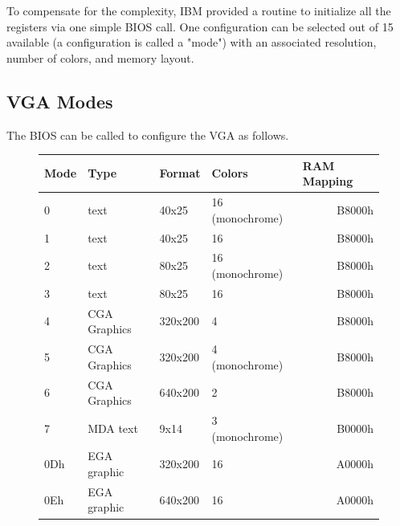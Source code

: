 \documentclass[book.tex]{subfiles}
\begin{document}
\bigskip



To compensate for the complexity, IBM provided a routine to initialize all the registers via one simple BIOS call. One configuration can be selected out of 15 available (a configuration is called a "mode") with an associated resolution, number of colors, and memory layout.

\subsection{VGA Modes}

The BIOS can be called to configure the VGA as follows.

\begin{figure}[H]
\centering
\begin{table}[H]
\begin{tabularx}{\textwidth}[c]{llllr}
\hline
\textbf{Mode} & \textbf{Type} & \textbf{Format} & \textbf{Colors} & \multicolumn{1}{l}{\textbf{RAM Mapping}} \\ \hline
0             & text          & 40x25           & 16 (monochrome) & B8000h                                \\ \hline
1             & text          & 40x25           & 16              & B8000h                                \\ \hline
2             & text          & 80x25           & 16 (monochrome) & B8000h                                \\ \hline
3             & text          & 80x25           & 16              & B8000h                                \\ \hline
4             & CGA Graphics  & 320x200         & 4               & B8000h                                \\ \hline
5             & CGA Graphics  & 320x200         & 4 (monochrome)  & B8000h                                \\ \hline
6             & CGA Graphics  & 640x200         & 2               & B8000h                                \\ \hline
7             & MDA text      & 9x14            & 3 (monochrome)  & B0000h                                \\ \hline
0Dh           & EGA graphic   & 320x200         & 16              & A0000h                                \\ \hline
0Eh           & EGA graphic   & 640x200         & 16              & A0000h                                \\ \hline

\end{tabularx}
\end{table}
\end{figure}
\end{document}
